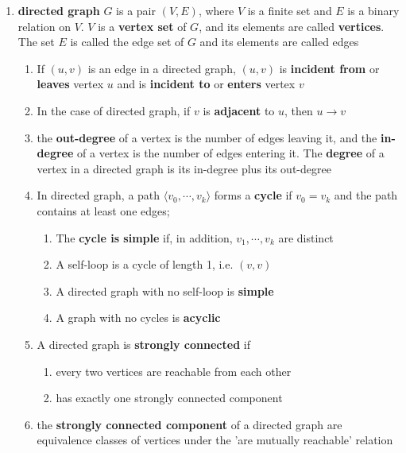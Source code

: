 \documentclass[11pt]{article}
\begin{document}
\begin{defn*}
    $ $\\
    \begin{enumerate}
        \item \textbf{directed graph} $G$ is a pair $(V, E)$, where $V$ is a finite set and $E$ is a binary relation on $V$. $V$ is a \textbf{vertex set} of $G$, and its elements are called \textbf{vertices}. The set $E$ is called the edge set of $G$ and its elements are called edges
        \begin{enumerate}
            \item If $(u,v)$ is an edge in a directed graph, $(u,v)$ is \textbf{incident from} or \textbf{leaves} vertex $u$ and is \textbf{incident to} or \textbf{enters} vertex $v$
            \item In the case of directed graph, if $v$ is \textbf{adjacent} to $u$, then $u \to v$
            \item the \textbf{out-degree} of a vertex is the number of edges leaving it, and the \textbf{in-degree} of a vertex is the number of edges entering it. The \textbf{degree} of a vertex in a directed graph is its in-degree plus its out-degree
            \item In directed graph, a path $\langle v_0, \cdots, v_k \rangle$ forms a \textbf{cycle} if $v_0 = v_k$ and the path contains at least one edges; 
            \begin{enumerate}
                \item The \textbf{cycle is simple} if, in addition, $v_1, \cdots, v_k$ are distinct
                \item A self-loop is a cycle of length 1, i.e. $(v, v)$
                \item A directed graph with no self-loop is \textbf{simple}
                \item A graph with no cycles is \textbf{acyclic}
            \end{enumerate}
            \item A directed graph is \textbf{strongly connected} if 
            \begin{enumerate}
                \item every two vertices are reachable from each other 
                \item has exactly one strongly connected component
            \end{enumerate}
            \item the \textbf{strongly connected component} of a directed graph are equivalence classes of vertices under the 'are mutually reachable' relation

\end{enumerate}
\end{enumerate}
\end{defn*}
\end{document}
